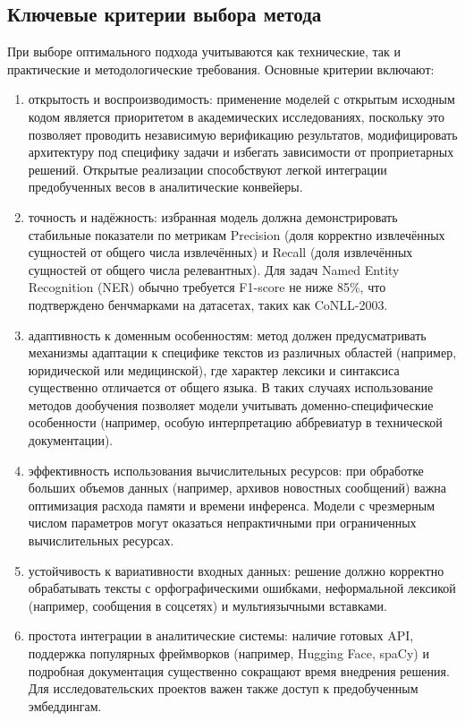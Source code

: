 \subsection{Ключевые критерии выбора метода}

При выборе оптимального подхода учитываются как технические, так и практические и методологические требования. Основные критерии включают:

\begin{enumerate}
    \item открытость и воспроизводимость:
    применение моделей с открытым исходным кодом является приоритетом в академических исследованиях, поскольку это позволяет проводить независимую верификацию результатов, модифицировать архитектуру под специфику задачи и избегать зависимости от проприетарных решений. Открытые реализации способствуют легкой интеграции предобученных весов в аналитические конвейеры.

    \item точность и надёжность:  
    избранная модель должна демонстрировать стабильные показатели по метрикам Precision (доля корректно извлечённых сущностей от общего числа извлечённых) и Recall (доля извлечённых сущностей от общего числа релевантных). Для задач Named Entity Recognition (NER) обычно требуется F1-score не ниже 85\%, что подтверждено бенчмарками на датасетах, таких как CoNLL-2003.

    \item адаптивность к доменным особенностям:
    метод должен предусматривать механизмы адаптации к специфике текстов из различных областей (например, юридической или медицинской), где характер лексики и синтаксиса существенно отличается от общего языка. В таких случаях использование методов дообучения позволяет модели учитывать доменно-специфические особенности (например, особую интерпретацию аббревиатур в технической документации).

    \item эффективность использования вычислительных ресурсов:
    при обработке больших объемов данных (например, архивов новостных сообщений) важна оптимизация расхода памяти и времени инференса. Модели с чрезмерным числом параметров могут оказаться непрактичными при ограниченных вычислительных ресурсах.

    \item устойчивость к вариативности входных данных:
    решение должно корректно обрабатывать тексты с орфографическими ошибками, неформальной лексикой (например, сообщения в соцсетях) и мультиязычными вставками.

    \item простота интеграции в аналитические системы:
    наличие готовых API, поддержка популярных фреймворков (например, Hugging Face, spaCy) и подробная документация существенно сокращают время внедрения решения. Для исследовательских проектов важен также доступ к предобученным эмбеддингам.
\end{enumerate}

